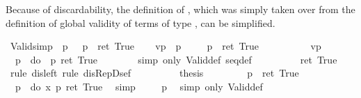 \begin{isabellebody}
\begin{isamarkuptext}
Because of discardability, the definition of , which 
  was simply taken over from the definition of global validity of terms of type
  , can be simplified.
  \label{isa:valid-simp}%
\end{isamarkuptext}%
\isamarkuptrue%
\ Valid{\isacharunderscore}simp{\isacharcolon}\ {\isachardoublequote}{\isacharparenleft}{\isasymturnstile}\ p{\isacharparenright}\ {\isacharequal}\ {\isacharparenleft}{\isasymDown}\ p\ {\isacharequal}\ ret\ True{\isacharparenright}{\isachardoublequote}\isanewline
\isamarkupfalse%
\isanewline
\ \ \isamarkupfalse%
\ vp{\isacharcolon}\ {\isachardoublequote}{\isasymturnstile}\ p{\isachardoublequote}\isanewline
\ \ \isamarkupfalse%
\ {\isachardoublequote}{\isasymDown}\ p\ {\isacharequal}\ ret\ True{\isachardoublequote}\isanewline
\ \ \isamarkupfalse%
\ {\isacharminus}\isanewline
\ \ \ \ \isamarkupfalse%
\ vp\ \isamarkupfalse%
\ {\isachardoublequote}{\isasymDown}\ p\ {\isacharequal}\ do\ {\isacharbraceleft}{\isasymDown}\ p{\isacharsemicolon}\ ret\ True{\isacharbraceright}{\isachardoublequote}\isanewline
\ \ \ \ \ \ \isamarkupfalse%
\ {\isacharparenleft}simp\ only{\isacharcolon}\ Valid{\isacharunderscore}def\ seq{\isacharunderscore}def{\isacharparenright}\isanewline
\ \ \ \ \isamarkupfalse%
\ \isamarkupfalse%
\ {\isachardoublequote}{\isasymdots}\ {\isacharequal}\ ret\ True{\isachardoublequote}\ \isamarkupfalse%
\ {\isacharparenleft}rule\ dis{\isacharunderscore}left{\isacharcomma}\ rule\ dis{\isacharunderscore}Rep{\isacharunderscore}Dsef{\isacharparenright}\ \ \isanewline
\ \ \ \ \isamarkupfalse%
\ \isamarkupfalse%
\ {\isacharquery}thesis\ \isamarkupfalse%
\isacommand{{\isachardot}}\isanewline
\ \ \isamarkupfalse%
\isanewline
\isamarkupfalse%
\isanewline
\ \ \isamarkupfalse%
\ {\isachardoublequote}{\isasymDown}\ p\ {\isacharequal}\ ret\ True{\isachardoublequote}\isanewline
\ \ \isamarkupfalse%
\ {\isachardoublequote}{\isasymDown}\ p\ {\isacharequal}\ do\ {\isacharbraceleft}x{\isasymleftarrow}{\isasymDown}\ p{\isacharsemicolon}\ ret\ True{\isacharbraceright}{\isachardoublequote}\ \isamarkupfalse%
\ simp\isanewline
\ \ \isamarkupfalse%
\ {\isachardoublequote}{\isasymturnstile}\ p{\isachardoublequote}\ \isamarkupfalse%
\ {\isacharparenleft}simp\ only{\isacharcolon}\ Valid{\isacharunderscore}def{\isacharparenright}\isanewline

\end{isabellebody}

